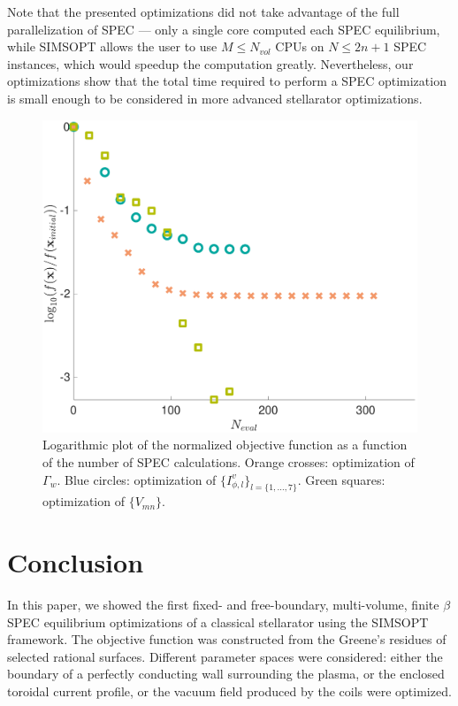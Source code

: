 \documentclass[my_thesis.tex]{subfiles}
\begin{document}
Note that the presented optimizations did not take advantage of the full parallelization of \ac{SPEC} --- only a single core computed each \ac{SPEC} equilibrium, while SIMSOPT allows the user to use $M\le N_{vol}$ \acp{CPU} on $N\le 2n+1$ \ac{SPEC} instances, which would speedup the computation greatly. Nevertheless, our optimizations show that the total time required to perform a SPEC optimization is small enough to be considered in more advanced stellarator optimizations.

\begin{figure}
    \centering
    \includegraphics[width=.45\textwidth]{main/Figures_Optimization/ObjectiveFunction.pdf}
    \caption{Logarithmic plot of the normalized objective function as a function of the number of \ac{SPEC} calculations. Orange crosses: optimization of $\Gamma_w$. Blue circles: optimization of $\{I^v_{\phi,l}\}_{l=\{1,\ldots,7\}}$. Green squares: optimization of $\{V_{mn}\}$.}
    \label{fig:objective_function}
\end{figure}



\section{Conclusion}

In this paper, we showed the first fixed- and free-boundary, multi-volume, finite $\beta$ \ac{SPEC} equilibrium optimizations of a classical stellarator using the SIMSOPT framework. The objective function was constructed from the Greene's residues of selected rational surfaces. Different parameter spaces were considered: either the boundary of a perfectly conducting wall surrounding the plasma, or the enclosed toroidal current profile, or the vacuum field produced by the coils were optimized. 
\end{document}
